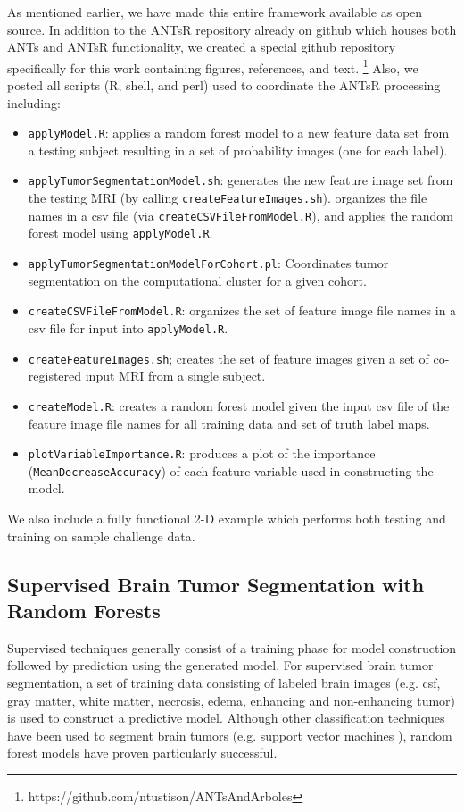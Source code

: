 \documentclass[final,5p,times,twocolumn]{elsarticle}
\begin{document}
As mentioned earlier, we have made this entire framework
available as open source.  In addition to the ANTsR repository
already on github which houses both ANTs and ANTsR functionality, 
we created a special github repository specifically for this work
containing figures, references, and text.%
\footnote{
https://github.com/ntustison/ANTsAndArboles
}
Also, we posted all
scripts (R, shell, and perl) used to coordinate the ANTsR processing 
including:
\begin{itemize}
  \item {\tt applyModel.R}:  applies a random forest model to a new 
  feature data set from a testing subject resulting in a set of probability
  images (one for each label).
  \item {\tt applyTumorSegmentationModel.sh}:  generates the new feature image set 
  from the testing MRI (by calling {\tt createFeatureImages.sh}).
  organizes the file names in a csv file (via {\tt createCSVFileFromModel.R}),
  and applies the random forest model using {\tt applyModel.R}. 
  \item {\tt applyTumorSegmentationModelForCohort.pl}:  Coordinates tumor 
  segmentation on the computational cluster for a given cohort.
  \item {\tt createCSVFileFromModel.R}:  organizes the set of feature image
  file names in a csv file for input into {\tt applyModel.R}.
  \item {\tt createFeatureImages.sh};  creates the set of feature images given
  a set of co-registered input MRI from a single subject. 
  \item {\tt createModel.R}:  creates a random forest model given the input csv 
  file of the feature image file names for all training data and set of truth
  label maps.
  \item {\tt plotVariableImportance.R}:  produces a plot of the importance 
  ({\tt MeanDecreaseAccuracy}) of each feature variable used 
  in constructing the model.
\end{itemize}
We also include a fully functional 2-D example which performs
both testing and training on sample challenge data.  

\subsection{Supervised Brain Tumor Segmentation with Random Forests}

Supervised techniques generally consist of a training phase
for model construction followed by prediction using the 
generated model.  For supervised brain tumor segmentation, 
a set of training data consisting of labeled brain images 
(e.g. csf, gray matter, white matter, 
necrosis, edema, enhancing and  non-enhancing tumor) is
used to construct a predictive model.  Although other 
classification techniques have been used to segment
brain tumors (e.g. support vector machines \citep{bauer2011}),
random forest models have proven particularly successful.
\end{document}
